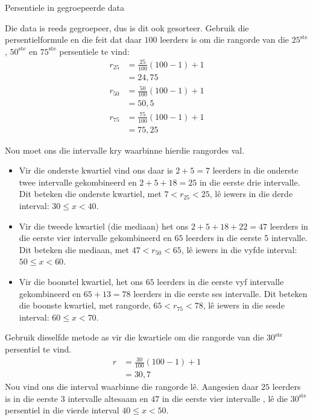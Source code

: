 \begin{wex}{Persentiele in gegroepeerde data}
{  

  Die data is reeds gegroepeer, dus is dit ook gesorteer. Gebruik die persentielformule en die feit dat daar
  $100$ leerders is om die rangorde van die $25^{\mathrm{ste}}$, $50^{\mathrm{ste}}$ en
  $75^{\mathrm{ste}}$ persentiele te vind:
  \begin{align*}
    r_{25} &= \frac{25}{100}\left(100-1\right)+1 \\
          &= 24,75 \\
    r_{50} &= \frac{50}{100}\left(100-1\right)+1 \\
          &= 50,5 \\
    r_{75} &= \frac{75}{100}\left(100-1\right)+1 \\
          &= 75,25
  \end{align*}

  Nou moet ons die intervalle kry waarbinne hierdie rangordes val.
  \begin{itemize}
  \item Vir die onderste kwartiel vind ons daar is $2 + 5 = 7$ leerders in die onderste twee intervalle gekombineerd en $2 + 5 + 18 = 25$
    in die eerste drie intervalle. Dit beteken die onderste kwartiel, met
    $7 < r_{25} < 25$,
    lê iewers in die derde interval: $30 \leq x < 40$.
  \item Vir die tweede kwartiel (die mediaan) het ons
    $2 + 5 + 18 + 22 = 47$ leerders in die eerste vier intervalle gekombineerd en $65$ leerders in die eerste 5 intervalle. Dit beteken die mediaan, met $47 < r_{50} < 65$,
    l\^e iewers in die vyfde interval: $50 \leq x < 60$.
  \item Vir die boonstel kwartiel, het ons $65$ leerders in die eerste vyf intervalle gekombineerd en  $65 + 13 = 78$ 
    leerders in die eerste ses intervalle. Dit beteken die boonste kwartiel, met rangorde,
    $65 < r_{75} < 78$,
    l\^e iewers in die sesde interval: $60 \leq x < 70$.
  \end{itemize}


  Gebruik dieselfde metode as vir die kwartiele om die rangorde van die $30^{\mathrm{ste}}$ persentiel te vind.
  \begin{align*}
    r &= \frac{30}{100}\left(100-1\right)+1 \\
      &= 30,7
  \end{align*}
  Nou vind ons die interval waarbinne die rangorde l\^e. Aangesien daar $25$ leerders is in die eerste $3$ intervalle altesaam en $47$
  in die eerste vier intervalle , l\^e die $30^{\mathrm{ste}}$ persentiel in die vierde interval $40 \leq x < 50$.
}
\end{wex}

